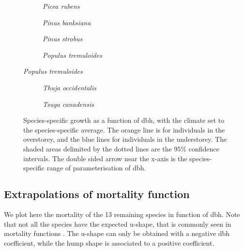 \begin{refsection}
\begin{figure}[htb] \ContinuedFloat %
	\centering
	\begin{subfigure}{0.48\textwidth}
		
		\caption{\textit{Picea rubens}}
		\label{fig::picrub_G_dbh}
	\end{subfigure}
	\hfil
	\begin{subfigure}{0.48\textwidth}
		
		\caption{\textit{Pinus banksiana}}
		\label{fig::pinban_G_dbh}
	\end{subfigure}
	\medskip
	\begin{subfigure}{0.48\textwidth}
		
		\caption{\textit{Pinus strobus}}
		\label{fig::pinstr_G_dbh}
	\end{subfigure}
	\hfil
	\begin{subfigure}{0.48\textwidth}
		
		\caption{\textit{Populus tremuloides}}
		\label{fig::poptre_G_dbh}
	\end{subfigure}
\end{figure}

\begin{figure}[htb] \ContinuedFloat %
	\centering
	\begin{subfigure}{0.48\textwidth}
		
		\caption{\textit{Thuja occidentalis}}
		\label{fig::thuocc_G_dbh}
	\end{subfigure}
	\hfil
	\begin{subfigure}{0.48\textwidth}
		
		\caption{\textit{Tsuga canadensis}}
		\label{fig::tsucan_G_dbh}
	\end{subfigure}
	\caption{Species-specific growth as a function of dbh, with the climate set to the species-specific average. The orange line is for individuals in the overstorey, and the blue lines for individuals in the understorey. The shaded areas delimited by the dotted lines are the $ 95 \% $ confidence intervals. The double sided arrow near the x-axis is the species-specific range of parameterisation of dbh.}
	\label{fig::12speciesG_dbh}
\end{figure}

\subsection{Extrapolations of mortality function}
We plot here the mortality of the 13 remaining species in function of dbh. Note that not all the species have the expected u-shape, that is commonly seen in mortality functions \citep{Lines2010}. The u-shape can only be obtained with a negative dbh coefficient, while the hump shape is associated to a positive coefficient.


\end{refsection}
